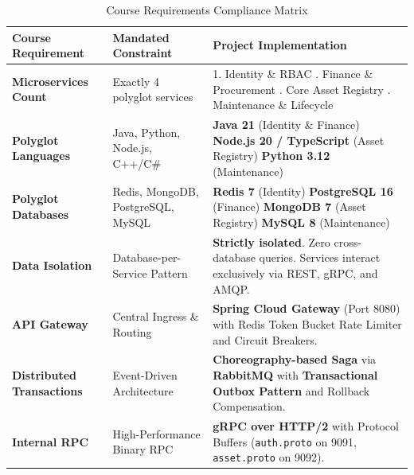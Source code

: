 \documentclass[11pt,a4paper]{article}
\begin{document}
\begin{table}[H]
\centering
\small
\begin{tabular}{p{4.5cm} p{4.5cm} p{5.5cm}}
\toprule
\textbf{Course Requirement} & \textbf{Mandated Constraint} & \textbf{Project Implementation} \\
\midrule
\textbf{Microservices Count} & Exactly 4 polyglot services & 1. Identity \& RBAC \newline 2. Finance \& Procurement \newline 3. Core Asset Registry \newline 4. Maintenance \& Lifecycle \\
\addlinespace
\textbf{Polyglot Languages} & Java, Python, Node.js, C++/C\# & \textbf{Java 21} (Identity \& Finance) \newline \textbf{Node.js 20 / TypeScript} (Asset Registry) \newline \textbf{Python 3.12} (Maintenance) \\
\addlinespace
\textbf{Polyglot Databases} & Redis, MongoDB, PostgreSQL, MySQL & \textbf{Redis 7} (Identity) \newline \textbf{PostgreSQL 16} (Finance) \newline \textbf{MongoDB 7} (Asset Registry) \newline \textbf{MySQL 8} (Maintenance) \\
\addlinespace
\textbf{Data Isolation} & Database-per-Service Pattern & \textbf{Strictly isolated}. Zero cross-database queries. Services interact exclusively via REST, gRPC, and AMQP. \\
\addlinespace
\textbf{API Gateway} & Central Ingress \& Routing & \textbf{Spring Cloud Gateway} (Port 8080) with Redis Token Bucket Rate Limiter and Circuit Breakers. \\
\addlinespace
\textbf{Distributed Transactions} & Event-Driven Architecture & \textbf{Choreography-based Saga} via \textbf{RabbitMQ} with \textbf{Transactional Outbox Pattern} and Rollback Compensation. \\
\addlinespace
\textbf{Internal RPC} & High-Performance Binary RPC & \textbf{gRPC over HTTP/2} with Protocol Buffers (\texttt{auth.proto} on 9091, \texttt{asset.proto} on 9092). \\
\bottomrule
\end{tabular}
\caption{Course Requirements Compliance Matrix}
\end{table}

\newpage
\end{document}
